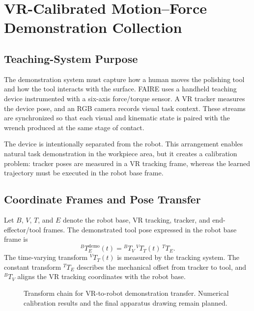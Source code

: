 \chapter{VR-Calibrated Motion--Force Demonstration Collection}
\label{chap:demonstration_collection}

\section{Teaching-System Purpose}
The demonstration system must capture how a human moves the polishing tool and how the tool interacts with the surface. FAIRE uses a handheld teaching device instrumented with a six-axis force/torque sensor. A VR tracker measures the device pose, and an RGB camera records visual task context. These streams are synchronized so that each visual and kinematic state is paired with the wrench produced at the same stage of contact.

The device is intentionally separated from the robot. This arrangement enables natural task demonstration in the workpiece area, but it creates a calibration problem: tracker poses are measured in a VR tracking frame, whereas the learned trajectory must be executed in the robot base frame.

\section{Coordinate Frames and Pose Transfer}
Let \(B\), \(V\), \(T\), and \(E\) denote the robot base, VR tracking, tracker, and end-effector/tool frames. The demonstrated tool pose expressed in the robot base frame is
\begin{equation}
  {}^{B}\!T_{E}^{\mathrm{demo}}(t)
  =
  {}^{B}\!T_{V}\,
  {}^{V}\!T_{T}(t)\,
  {}^{T}\!T_{E}.
  \label{eq:demo_transfer}
\end{equation}
The time-varying transform \({}^{V}\!T_T(t)\) is measured by the tracking system. The constant transform \({}^{T}\!T_E\) describes the mechanical offset from tracker to tool, and \({}^{B}\!T_V\) aligns the VR tracking coordinates with the robot base.

\begin{figure}[t]
  \centering
  \caption{Transform chain for VR-to-robot demonstration transfer. Numerical calibration results and the final apparatus drawing remain planned.}
  \label{fig:demo_transfer}
\end{figure}

